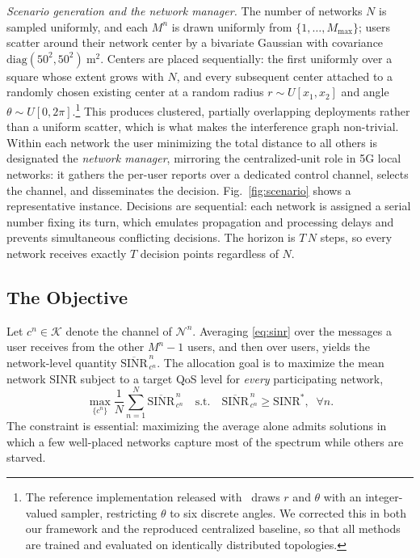\documentclass[journal]{IEEEtran}
\begin{document}
\emph{Scenario generation and the network manager.} The number of networks $N$
is sampled uniformly, and each $M^{n}$ is drawn uniformly from
$\{1,\dots,M_{\max}\}$; users scatter around their network center by a
bivariate Gaussian with covariance
$\mathrm{diag}(50^{2},50^{2})~\mathrm{m}^{2}$. Centers are placed
sequentially: the first uniformly over a square whose extent grows with $N$,
and every subsequent center attached to a randomly chosen existing center at a
random radius $r\sim U[x_{1},x_{2}]$ and angle $\theta\sim
U[0,2\pi]$.\footnote{The reference implementation released
with~\cite{cohen2024carlton} draws $r$ and $\theta$ with an integer-valued
sampler, restricting $\theta$ to six discrete angles. We corrected this in both
our framework and the reproduced centralized baseline, so that all methods are
trained and evaluated on identically distributed topologies.} This produces
clustered, partially overlapping deployments rather than a uniform scatter,
which is what makes the interference graph non-trivial. Within each network the
user minimizing the total distance to all others is designated the
\emph{network manager}, mirroring the centralized-unit role in 5G local
networks: it gathers the per-user reports over a dedicated control channel,
selects the channel, and disseminates the decision.
Fig.~\ref{fig:scenario} shows a representative instance. Decisions are
sequential: each network is assigned a serial number fixing its turn, which
emulates propagation and processing delays and prevents simultaneous
conflicting decisions. The horizon is $T\,N$ steps, so every network receives
exactly $T$ decision points regardless of $N$.

\subsection{The Objective}
\label{subsec:model_objective}

Let $c^{n}\in\mathcal{K}$ denote the channel of $\mathcal{N}^{n}$. Averaging
\eqref{eq:sinr} over the messages a user receives from the other $M^{n}-1$
users, and then over users, yields the network-level quantity
$\overline{\mathrm{SINR}}^{\,n}_{\,c^{n}}$. The allocation goal is to maximize
the mean network SINR subject to a target QoS level for \emph{every}
participating network,
\begin{equation}
\max_{\{c^{n}\}} \frac{1}{N}\sum_{n=1}^{N}
      \overline{\mathrm{SINR}}^{\,n}_{\,c^{n}}
\quad\text{s.t.}\quad \overline{\mathrm{SINR}}^{\,n}_{\,c^{n}}
      \geq \mathrm{SINR}^{*},\;\; \forall n .
\label{eq:objective}
\end{equation}
The constraint is essential: maximizing the average alone admits solutions in
which a few well-placed networks capture most of the spectrum while others are
starved.
\end{document}
